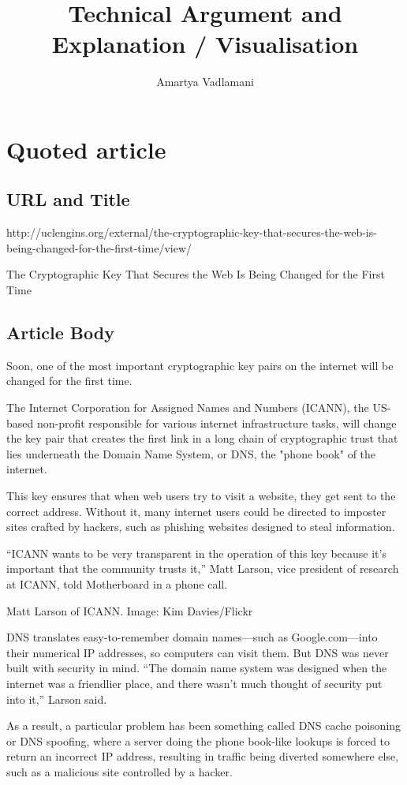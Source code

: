 \documentclass{article}
\author {Amartya Vadlamani}
\title{Technical Argument and Explanation / Visualisation}
\begin{document}
\maketitle{}

\section {Quoted article}

\subsection {URL and Title}
http://uclengins.org/external/the-cryptographic-key-that-secures-the-web-is-being-changed-for-the-first-time/view/

The Cryptographic Key That Secures the Web Is Being Changed for the First Time

\subsection {Article Body}
Soon, one of the most important cryptographic key pairs on the internet will be
changed for the first time.

The Internet Corporation for Assigned Names and Numbers (ICANN), the US-based
non-profit responsible for various internet infrastructure tasks, will change
the key pair that creates the first link in a long chain of cryptographic trust
that lies underneath the Domain Name System, or DNS, the "phone book" of the
internet.

This key ensures that when web users try to visit a website, they get sent to
the correct address. Without it, many internet users could be directed to
imposter sites crafted by hackers, such as phishing websites designed to steal
information.

“ICANN wants to be very transparent in the operation of this key because it's
important that the community trusts it,” Matt Larson, vice president of
research at ICANN, told Motherboard in a phone call.

Matt Larson of ICANN. Image: Kim Davies/Flickr

DNS translates easy-to-remember domain names—such as Google.com—into their
numerical IP addresses, so computers can visit them. But DNS was never built
with security in mind. “The domain name system was designed when the internet
was a friendlier place, and there wasn't much thought of security put into it,”
Larson said.

As a result, a particular problem has been something called DNS cache poisoning
or DNS spoofing, where a server doing the phone book-like lookups is forced to
return an incorrect IP address, resulting in traffic being diverted somewhere
else, such as a malicious site controlled by a hacker.
\end{document}
